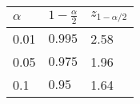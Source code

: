 \documentclass{standalone}
\begin{document}
\begin{tabular}{l|l|l}
	$\alpha$ & $1- \frac{\alpha}{2}$ & $z_{1 - \alpha/2}$\\
	\hline
	0.01   & $0.995$ & 2.58\\
	0.05   & $0.975$ & 1.96\\
	0.1    & $0.95$  & 1.64\\
\end{tabular}
\end{document}
